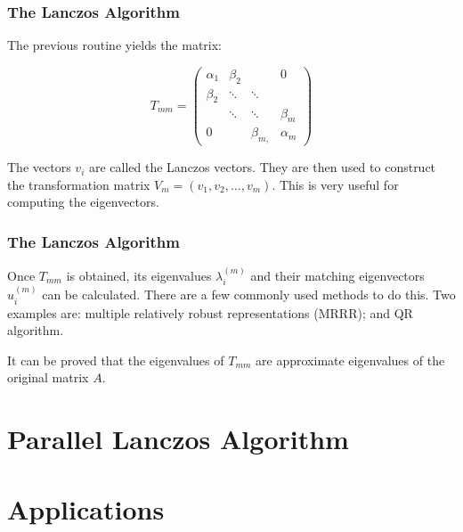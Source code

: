 \documentclass[pdf]{beamer}
\begin{document}
\begin{frame}
\frametitle{The Lanczos Algorithm}

The previous routine yields the matrix:

\[ T_{mm} = \left( \begin{array}{cccc}
\alpha_1 & \beta_{2} & & 0\\
\beta_{2} & \ddots &\ddots & \\
& \ddots & \ddots & \beta_{m} \\
0 & & \beta_{m,} & \alpha_m \end{array} \right) \]

The vectors $v_i$ are called the Lanczos vectors. They are then used to construct the transformation matrix $V_m=(v_1,v_2,\dots,v_m)$. This is very useful for computing the eigenvectors.

\end{frame}


\begin{frame}
\frametitle{The Lanczos Algorithm}

Once $T_{mm}$ is obtained, its eigenvalues $\lambda^{(m)}_i$ and their matching eigenvectors $u^{(m)}_i$ can be calculated. There are a few commonly used methods to do this. Two examples are: multiple relatively robust representations (MRRR); and QR algorithm.

It can be proved that the eigenvalues of $T_{mm}$ are approximate eigenvalues of the original matrix $A$.


\end{frame}





\section{Parallel Lanczos Algorithm}

\begin{frame}
\tableofcontents[currentsection]
\end{frame}

\begin{frame}


\end{frame}




\section{Applications}
\end{document}
